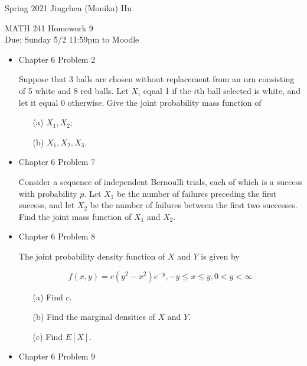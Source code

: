 \documentclass[11pt]{article}
\begin{document}
\enlargethispage{\baselineskip}

Spring 2021 \hfill Jingchen (Monika) Hu\\

\begin{center}
{\huge MATH 241 Homework 9}	\\
Due: Sunday 5/2 11:59pm to Moodle
\end{center}
\vspace{0.5cm}


\begin{itemize}

    \item
    Chapter 6 Problem  2
    
    Suppose that 3 balls are chosen without replacement from an urn consisting of 5 white and 8 red balls. Let $X_i$ equal 1 if the $i$th ball selected is white, and let it equal 0 otherwise. Give the joint probability mass function of
    
    \begin{itemize}
    \item[(a)] $X_1, X_2$;
    \item[(b)] $X_1, X_2, X_3$.
    \end{itemize}

    \item
    Chapter 6 Problem  7
    
    Consider a sequence of independent Bernoulli trials, each of which is a success with probability $p$. Let $X_1$ be the number of failures preceding the first success, and let $X_2$ be the number of failures between the first two successes. Find the joint mass function of $X_1$ and $X_2$.

    \item
    Chapter 6 Problem  8
    
    The joint probability density function of $X$ and $Y$ is given by
    
    $$
    f(x, y) = c(y^2 - x^2)e^{-y}, -y \leq x \leq y, 0 < y < \infty
    $$
    
    \begin{itemize}
    \item[(a)] Find $c$.
    \item[(b)] Find the marginal densities of $X$ and $Y$.
    \item[(c)] Find $E[X]$.
    \end{itemize}

    \item
    Chapter 6 Problem  9
    

\end{itemize}
\end{document}
